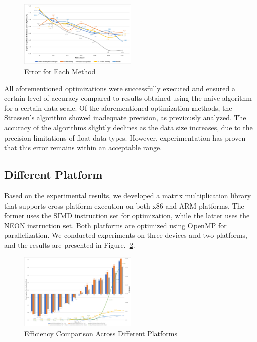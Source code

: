 \documentclass[conference]{IEEEtran}
\begin{document}
	\begin{figure}[htbp]
		\centerline{\includegraphics[width=0.5\textwidth]{fig10.png}}
		\caption{Error for Each Method}
		\label{fig::error}
	\end{figure}
	
	All aforementioned optimizations were successfully executed and ensured a certain level of accuracy compared to results obtained using the naive algorithm for a certain data scale. Of the aforementioned optimization methods, the Strassen's algorithm showed inadequate precision, as previously analyzed. The accuracy of the algorithms slightly declines as the data size increases, due to the precision limitations of float data types. However, experimentation has proven that this error remains within an acceptable range.
	
	\subsection{Different Platform}
	
	Based on the experimental results, we developed a matrix multiplication library that supports cross-platform execution on both x86 and ARM platforms. The former uses the SIMD instruction set for optimization, while the latter uses the NEON instruction set. Both platforms are optimized using OpenMP for parallelization. We conducted experiments on three devices and two platforms, and the results are presented in Figure.~\ref{fig::platform}.
	
	\begin{figure}[htbp]
		\centerline{\includegraphics[width=0.5\textwidth]{fig11.png}}
		\caption{Efficiency Comparison Across Different Platforms}
		\label{fig::platform}
	\end{figure}
\end{document}

